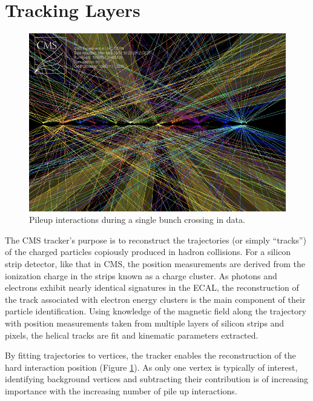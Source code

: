 \section{Tracking Layers}

\begin{figure}
\begin{center}
\includegraphics[width=.75\textwidth]{pics/pileup_vertices}
\end{center}
\caption{Pileup interactions during a single bunch crossing in data.}
\label{fig:pileup}
\end{figure}

The CMS tracker's purpose is to reconstruct the trajectories (or simply ``tracks'') of the charged particles
 copiously produced in hadron collisions. For a silicon strip detector, like that in CMS, the position measurements are derived from the ionization charge in the strips known as a charge cluster. As photons and electrons exhibit nearly identical signatures in the ECAL, 
the reconstruction of the track associated with electron energy clusters
is the main component of their particle identification. Using knowledge of the magnetic field along the 
trajectory with position measurements taken from multiple layers of silicon strips and
 pixels, the helical tracks are fit and kinematic parameters extracted.  

By fitting trajectories to vertices, the tracker enables the reconstruction 
of the hard interaction position (Figure \ref{fig:pileup}). As only one vertex is typically
of interest, identifying background vertices and subtracting their contribution is of increasing
importance with the increasing number of pile up interactions. 

